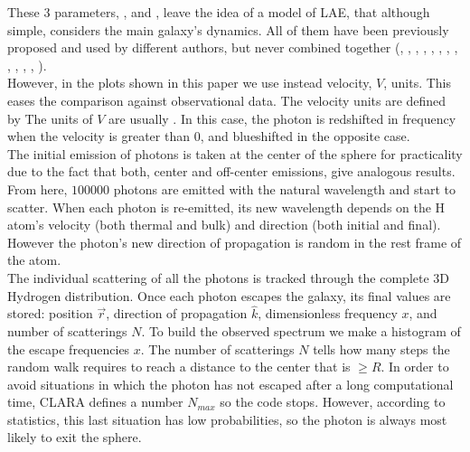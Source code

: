\documentclass[twocolappendix]{latex/emulateapj}
\begin{document}
These 3 parameters, \vrot, \vout and \tauh, leave the idea of a model of LAE, that although simple, considers the main galaxy's dynamics. All of them have been previously proposed and used by different authors, but never combined together (\cite{Adams72}, \cite{Harrington73}, \cite{Neufeld90}, \cite{Dijkstra06}, \cite{Verhamme06}, \cite{Forero12}, \cite{Martin2015}, \cite{Garavito14}, \cite{Neufeld91}, \cite{Laursen09}, \cite{Barnes11}, \cite{Verhamme12}, \cite{Yajima12}).\\

However, in the plots shown in this paper we use instead velocity, $V$, units. This eases the comparison against observational data. The velocity units are defined by
The units of $V$ are usually \kms. In this case, the photon is redshifted in frequency when the velocity is greater than 0, and blueshifted in the opposite case. \\

The initial emission of photons is taken at the center of the sphere for practicality due to the fact that both, center and off-center emissions, give analogous results. From here, $100000$ photons are emitted with the natural \lya wavelength and start to scatter. When each photon is re-emitted, its new wavelength depends on the H atom's velocity (both thermal and bulk) and direction (both initial and final). However the photon's new direction of propagation is random in the rest frame of the atom. \\ 

The individual scattering of all the photons is tracked through the complete 3D Hydrogen distribution. Once each photon escapes the galaxy, its final values are stored: position $\vec{r}$, direction of propagation $\hat{k}$, dimensionless frequency $x$, and number of scatterings $N$. To build the observed spectrum we make a histogram of the escape frequencies $x$. The number of scatterings $N$ tells how many steps the random walk requires to reach a distance to the center that is $\geq R$. In order to avoid situations in which the photon has not escaped after a long computational time, CLARA defines a number $N_{max}$ so the code stops. However, according to statistics, this last situation has low probabilities, so the photon is always most likely to exit the sphere. \\

\end{document}

